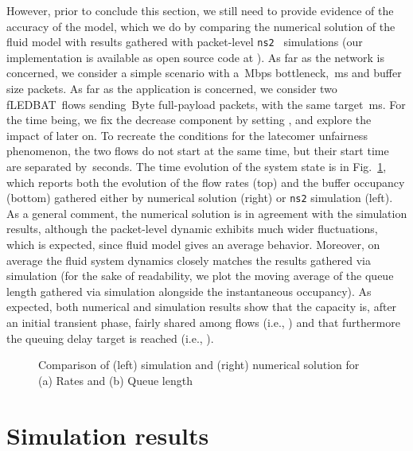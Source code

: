 \documentclass[conference]{IEEEtran}
\newcommand{\figR}[1]{Fig.~\ref{fig:#1}}
\newcommand{\figLC}[2]{
        \caption{#2}
        \label{fig:#1}
        \vspace{-5pt}
}
\newcommand{\fledbat}[0]{fLEDBAT}
\begin{document}
However, prior to conclude this section, we still need to provide evidence of the accuracy of the model, which we do by comparing the numerical solution of the fluid model with results gathered with packet-level \texttt{ns2}~\cite{ns2} simulations (our implementation is available as open source code at \cite{ledbat_code}). As far as the network is concerned, we consider a simple scenario with a  \,Mbps bottleneck, \,ms and buffer size  packets. As far as the application is concerned, we consider two \fledbat\ flows sending \,Byte full-payload packets, with the same target \,ms. For the time being, we fix the decrease component by setting , and explore the impact of  later on. To recreate the conditions for the latecomer unfairness phenomenon,
the two flows do not start at the same time, but their start time are separated by \,seconds. The time evolution of the system state is in  \figR{comparison}, which reports both the evolution of the flow rates  (top) and the buffer occupancy  (bottom) gathered either by numerical solution (right) or \texttt{ns2} simulation (left).  As a general comment, the numerical solution is in agreement with the simulation results, although the packet-level dynamic exhibits much wider fluctuations, which is expected, since fluid model gives an average behavior. Moreover, on average the fluid system dynamics closely matches the results gathered via simulation (for the sake of readability, we plot the moving average of the queue length gathered via simulation alongside the instantaneous occupancy).  As expected, both numerical and simulation results show that the capacity is, after an initial transient phase, fairly shared among flows (i.e., ) and that furthermore the queuing delay target is reached (i.e., ).

\begin{figure}[t]
    \begin{center}
        \figLC{comparison}{Comparison of (left) simulation and (right) numerical solution for (a) Rates and (b) Queue length}
    \end{center}
\end{figure}



\section{Simulation results}\label{sec:simulation}
\begin{figure*}[t]
    \begin{center}
        \figLC{time}{Time evolution of \fledbat\ dynamics with (a) chunk-based  and (b) backlogged  traffic models.}
    \end{center}
\vspace{-4mm}
\end{figure*}
\end{document}
